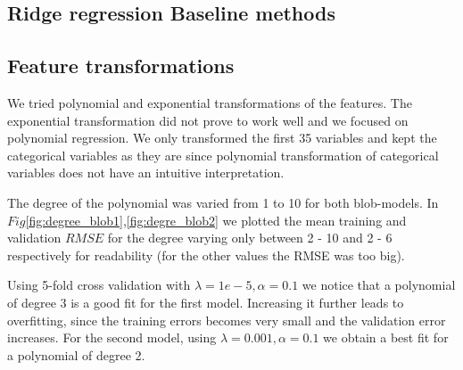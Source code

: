 \documentclass{article} %
\begin{document}
\subsection{Ridge regression Baseline methods}
 

\subsection{Feature transformations}
We tried polynomial and exponential transformations of the features.
The exponential transformation did not prove to work well and we focused on polynomial regression.
We only transformed the first 35 variables and kept the categorical variables as they are since  polynomial transformation of categorical variables does not have an intuitive interpretation. 

The degree of the polynomial was varied from 1 to 10 for both blob-models. In $Fig$\ref{fig:degree_blob1},\ref{fig:degre_blob2} we plotted the mean training and validation $RMSE$ for the degree varying only between 2 - 10 and 2 - 6 respectively for readability (for the other values the RMSE was too big).

Using 5-fold cross validation with $\lambda = 1e-5, \alpha = 0.1$ we
notice that a polynomial of degree 3 is a good fit for the first model. Increasing it further leads to overfitting, since the training errors becomes very small and the validation error increases. For the second model, using  $\lambda = 0.001, \alpha = 0.1$ we obtain a best fit for a polynomial of degree 2.
\end{document}
